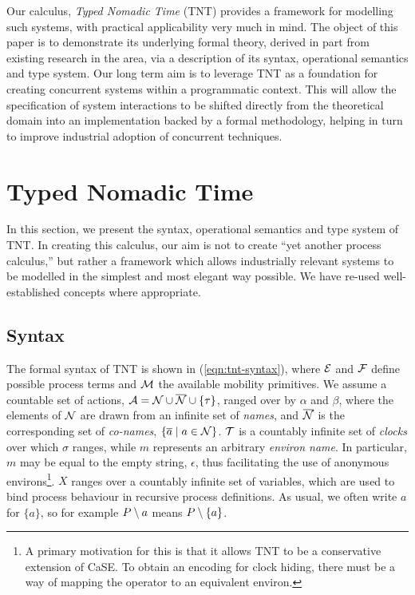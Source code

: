 \documentclass[orivec,envcountsame]{llncs}
\begin{document}
Our calculus, \emph{Typed Nomadic Time} (TNT) provides a framework for
modelling such systems, with practical applicability very much in
mind. The object of this paper is to demonstrate its underlying formal
theory, derived in part from existing research in the area, via a
description of its syntax, operational semantics and type system. Our
long term aim is to leverage TNT as a foundation for creating concurrent
systems within a programmatic context. This will allow the specification
of system interactions to be shifted directly from the theoretical
domain into an implementation backed by a formal methodology, helping in
turn to improve industrial adoption of concurrent techniques.

\section{Typed Nomadic Time}
\label{tnt}

In this section, we present the syntax, operational semantics and type
system of TNT. In creating this calculus, our aim is not to create ``yet
another process calculus,'' but rather a framework which allows
industrially relevant systems to be modelled in the simplest and most
elegant way possible. We have re-used well-established concepts where
appropriate.

\subsection{Syntax}

The formal syntax of TNT is shown in (\ref{eqn:tnt-syntax}), where
$\text{$\mathcal{E}$}$ and $\text{$\mathcal{F}$}$ define possible process terms and $\text{$\mathcal{M}$}$ the
available mobility primitives. We assume a countable set of actions,
$\text{$\mathcal{A}$} = \text{$\mathcal{N}$} \cup \text{$\overline{\text{$\mathcal{N}$}}$} \cup \{\tau\}$, ranged over by $\alpha$
and $\beta$, where the elements of $\text{$\mathcal{N}$}$ are drawn from an infinite
set of \emph{names}, and $\text{$\overline{\text{$\mathcal{N}$}}$}$ is the corresponding set of
\emph{co-names}, $\{\overline{a} \mid a \in \text{$\mathcal{N}$}\}$. $\text{$\mathcal{T}$}$ is a
countably infinite set of \emph{clocks} over which $\sigma$ ranges,
while $m$ represents an arbitrary \emph{environ name}. In particular,
$m$ may be equal to the empty string, $\epsilon$, thus facilitating the
use of anonymous environs\footnote{A primary motivation for this is that
it allows TNT to be a conservative extension of CaSE. To obtain an
encoding for clock hiding, there must be a way of mapping the operator
to an equivalent environ.}. $X$ ranges over a countably infinite set of
variables, which are used to bind process behaviour in recursive process
definitions.  As usual, we often write $a$ for $\{a\}$, so for example
$P \setminus {a}$ means $P \setminus {\{a\}}$.
\end{document}
